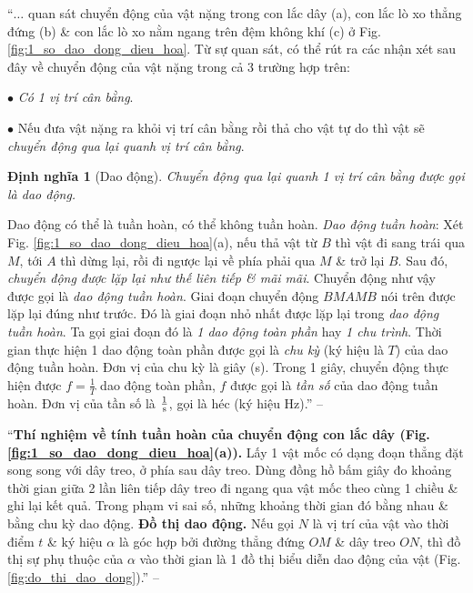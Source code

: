 \documentclass{article}
\numberwithin{equation}{section}
\newtheorem{dinhnghia}{Định nghĩa}[section]
\begin{document}
``$\ldots$ quan sát chuyển động của vật nặng trong con lắc dây (a), con lắc lò xo thẳng đứng (b) \& con lắc lò xo nằm ngang trên đệm không khí (c) ở Fig. \ref{fig:1_so_dao_dong_dieu_hoa}. Từ sự quan sát, có thể rút ra các nhận xét sau đây về chuyển động của vật nặng trong cả 3 trường hợp trên:
\begin{enumerate*}
	\item[$\bullet$] \textit{Có 1 vị trí cân bằng}.
	\item[$\bullet$] Nếu đưa vật nặng ra khỏi vị trí cân bằng rồi thả cho vật tự do thì vật sẽ \textit{chuyển động qua lại quanh vị trí cân bằng}.
\end{enumerate*}

\begin{dinhnghia}[Dao động]
	Chuyển động qua lại quanh 1 vị trí cân bằng được gọi là \emph{dao động}.
\end{dinhnghia}
Dao động có thể là tuần hoàn, có thể không tuần hoàn. \textit{Dao động tuần hoàn}: Xét Fig. \ref{fig:1_so_dao_dong_dieu_hoa}(a), nếu thả vật từ $B$ thì vật đi sang trái qua $M$, tới $A$ thì dừng lại, rồi đi ngược lại về phía phải qua $M$ \& trở lại $B$. Sau đó, \textit{chuyển động được lặp lại như thế liên tiếp \& mãi mãi}. Chuyển động như vậy được gọi là \textit{dao động tuần hoàn}. Giai đoạn chuyển động $BMAMB$ nói trên được lặp lại đúng như trước. Đó là giai đoạn nhỏ nhất được lặp lại trong \textit{dao động tuần hoàn}. Ta gọi giai đoạn đó là \textit{1 dao động toàn phần} hay \textit{1 chu trình}. Thời gian thực hiện 1 dao động toàn phần được gọi là \textit{chu kỳ} (ký hiệu là $T$) của dao động tuần hoàn. Đơn vị của chu kỳ là giây (s). Trong 1 giây, chuyển động thực hiện được $f = \frac{1}{T}$ dao động toàn phần, $f$ được gọi là \textit{tần số} của dao động tuần hoàn. Đơn vị của tần số là $\frac{1}{\rm s}$, gọi là héc (ký hiệu Hz).'' -- \cite[pp. 28--29]{SGK_Vat_Ly_12_nang_cao}

``\textbf{Thí nghiệm về tính tuần hoàn của chuyển động con lắc dây (Fig. \ref{fig:1_so_dao_dong_dieu_hoa}(a)).} Lấy 1 vật mốc có dạng đoạn thẳng đặt song song với dây treo, ở phía sau dây treo. Dùng đồng hồ bấm giây đo khoảng thời gian giữa 2 lần liên tiếp dây treo đi ngang qua vật mốc theo cùng 1 chiều \& ghi lại kết quả. Trong phạm vi sai số, những khoảng thời gian đó bằng nhau \& bằng chu kỳ dao động. \textbf{Đồ thị dao động.} Nếu gọi $N$ là vị trí của vật vào thời điểm $t$ \& ký hiệu $\alpha$ là góc hợp bởi đường thẳng đứng $OM$ \& dây treo $ON$, thì đồ thị sự phụ thuộc của $\alpha$ vào thời gian là 1 đồ thị biểu diễn dao động của vật (Fig. \ref{fig:do_thi_dao_dong}).'' -- \cite[p. 28]{SGK_Vat_Ly_12_nang_cao}
\end{document}
